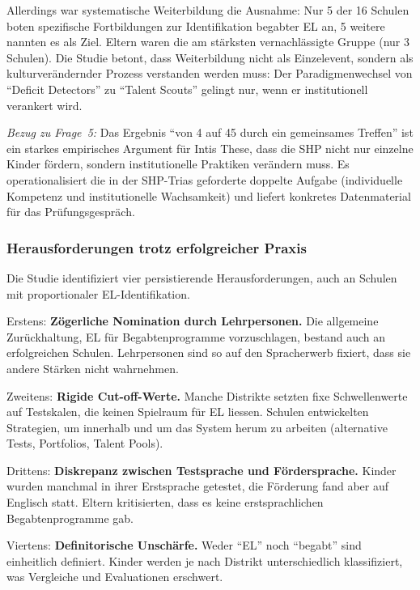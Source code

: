 \documentclass[ngerman, a4paper]{article}
\begin{document}
Allerdings war systematische Weiterbildung die Ausnahme: Nur 5 der 16
Schulen boten spezifische Fortbildungen zur Identifikation begabter EL an,
5 weitere nannten es als Ziel. Eltern waren die am stärksten
vernachlässigte Gruppe (nur 3 Schulen). Die Studie betont, dass
Weiterbildung nicht als Einzelevent, sondern als kulturverändernder
Prozess verstanden werden muss: Der Paradigmenwechsel von \enquote{Deficit
  Detectors} zu \enquote{Talent Scouts} gelingt nur, wenn er institutionell
verankert wird.

\textit{Bezug zu Frage~5:} Das Ergebnis \enquote{von 4 auf 45 durch ein
  gemeinsames Treffen} ist ein starkes empirisches Argument für Intis These,
dass die SHP nicht nur einzelne Kinder fördern, sondern institutionelle
Praktiken verändern muss. Es operationalisiert die in der SHP-Trias
geforderte doppelte Aufgabe (individuelle Kompetenz und institutionelle
Wachsamkeit) und liefert konkretes Datenmaterial für das
Prüfungsgespräch.

\subsubsection*{Herausforderungen trotz erfolgreicher Praxis}

Die Studie identifiziert vier persistierende Herausforderungen, auch an
Schulen mit proportionaler EL-Identifikation.

Erstens: \textbf{Zögerliche Nomination durch Lehrpersonen.} Die allgemeine
Zurückhaltung, EL für Begabtenprogramme vorzuschlagen, bestand auch an
erfolgreichen Schulen. Lehrpersonen sind so auf den Spracherwerb fixiert,
dass sie andere Stärken nicht wahrnehmen.

Zweitens: \textbf{Rigide Cut-off-Werte.} Manche Distrikte setzten fixe
Schwellenwerte auf Testskalen, die keinen Spielraum für EL liessen.
Schulen entwickelten Strategien, um innerhalb und um das System herum zu
arbeiten (alternative Tests, Portfolios, Talent Pools).

Drittens: \textbf{Diskrepanz zwischen Testsprache und Fördersprache.}
Kinder wurden manchmal in ihrer Erstsprache getestet, die Förderung fand
aber auf Englisch statt. Eltern kritisierten, dass es keine
erstsprachlichen Begabtenprogramme gab.

Viertens: \textbf{Definitorische Unschärfe.} Weder \enquote{EL} noch
\enquote{begabt} sind einheitlich definiert. Kinder werden je nach
Distrikt unterschiedlich klassifiziert, was Vergleiche und Evaluationen
erschwert.
\end{document}
